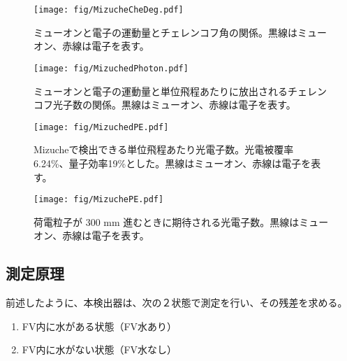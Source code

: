 \documentclass[11pt]{jreport}
\begin{document}
\begin{figure}[htbp]
\begin{minipage}{0.47\textwidth}
\centering
\texttt{[image: fig/MizucheCheDeg.pdf]}
\caption[ミューオンと電子の運動量とチェレンコフ角の関係]{ミューオンと電子の運動量とチェレンコフ角の関係。黒線はミューオン、赤線は電子を表す。}
\label{MizucheCheDeg}
\end{minipage}
\hfil
\begin{minipage}{0.47\textwidth}
\centering
\texttt{[image: fig/MizuchedPhoton.pdf]}
\caption[ミューオンと電子の運動量と単位飛程あたりに放出されるチェレンコフ光子数の関係]{ミューオンと電子の運動量と単位飛程あたりに放出されるチェレンコフ光子数の関係。黒線はミューオン、赤線は電子を表す。}
\label{MizuchedPhoton}
\end{minipage}
\end{figure}


\begin{figure}[htbp]
\begin{minipage}{0.47\textwidth}
\centering
\texttt{[image: fig/MizuchedPE.pdf]}
\caption[Mizucheで検出できる単位飛程あたりの光電子数]{Mizucheで検出できる単位飛程あたり光電子数。光電被覆率 6.24\%、量子効率19\%とした。黒線はミューオン、赤線は電子を表す。}
\label{MizuchedPE}
\end{minipage}
\hfil
\begin{minipage}{0.47\textwidth}
\centering
\texttt{[image: fig/MizuchePE.pdf]}
\caption[荷電粒子が 300 mm 進むときに期待される光電子数数]{荷電粒子が 300 mm 進むときに期待される光電子数。黒線はミューオン、赤線は電子を表す。}
\label{MizuchePE}
\end{minipage}
\end{figure}

\newpage
\subsection{測定原理}
前述したように、本検出器は、次の２状態で測定を行い、その残差を求める。
\begin{enumerate}
\item FV内に水がある状態（FV水あり）
\item FV内に水がない状態（FV水なし）
\end{enumerate}
\end{document}
